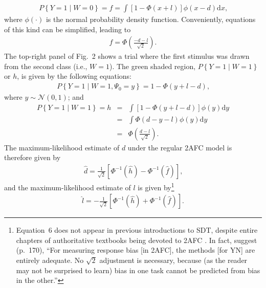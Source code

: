 \documentclass[man]{apa6}
\begin{document}
\begin{eqnarray*}
P\left\{Y=1\mid{}W=0\right\}=f=\int\!\left[1-\Phi\left(x+l\right)\right]\phi\left(x-d\right)\textrm{d}x\textrm{,}
\end{eqnarray*} where $\phi\left(\cdot\right)$ is the normal probability density function. Conveniently, equations of this kind can be simplified, leading to
\begin{eqnarray*}
f=\Phi\left(\frac{-d-l}{\sqrt{2}}\right)\textrm{.}
\end{eqnarray*}
The top-right panel of Fig.~2 shows a trial where the first stimulus was drawn from the second class (i.e., $W=1$). The green shaded region, $P\left\{Y=1\mid{}W=1\right\}$ or $h$, is given by the following equations:
\begin{eqnarray*}
P\left\{Y=1\mid{}W=1,\Psi_0=y\right\}=1-\Phi\left(y+l-d\right)\textrm{,}
\end{eqnarray*} where $y\sim\mathcal{N}\left(0,1\right)$; and
\begin{eqnarray*}
P\left\{Y=1\mid{}W=1\right\}=h&=&\int\!\left[1-\Phi\left(y+l-d\right)\right]\phi\left(y\right)\textrm{d}y\\
&=&\int\!\Phi\left(d-y-l\right)\phi\left(y\right)\textrm{d}y\\
&=&\Phi\left(\frac{d-l}{\sqrt{2}}\right)\textrm{.}
\end{eqnarray*}
The maximum-likelihood estimate of $d$ under the regular 2AFC model is therefore given by
\begin{eqnarray}
\hat{d}=\frac{1}{\sqrt{2}}\left[\Phi^{-1}\left(\hat{h}\right)-\Phi^{-1}\left(\hat{f}\right)\right]\textrm{,}
\label{eq5}
\end{eqnarray} and the maximum-likelihood estimate of $l$ is given by\footnote{Equation~6 does not appear in previous introductions to SDT, despite entire chapters of authoritative textbooks being devoted to 2AFC \parencite[e.g.,][]{Green1966, Macmillan2005}. In fact, \citeauthor{Macmillan2005} suggest (p.~170), ``For measuring response bias [in 2AFC], the methods [for YN] are entirely adequate. No $\sqrt{2}$ adjustment is necessary, because (as the reader may not be surprised to learn) bias in one task cannot be predicted from bias in the other.''}
\begin{eqnarray}
\hat{l}=-\frac{1}{\sqrt{2}}\left[\Phi^{-1}\left(\hat{h}\right)+\Phi^{-1}\left(\hat{f}\right)\right]\textrm{.}
\label{eq6}
\end{eqnarray}
\end{document}
